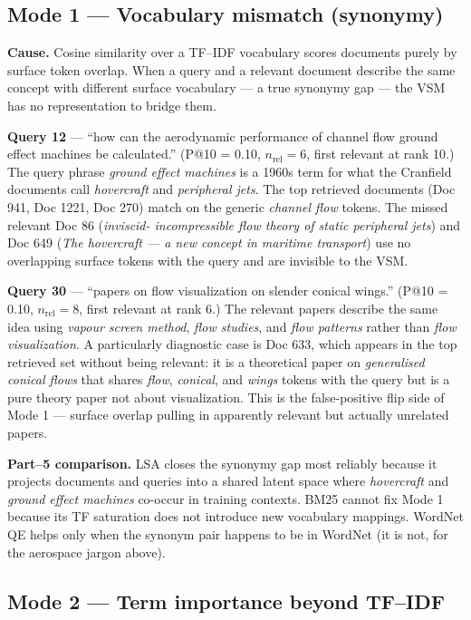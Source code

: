 \documentclass[11pt]{article}
\begin{document}
\subsection{Mode 1 --- Vocabulary mismatch (synonymy)}

\textbf{Cause.} Cosine similarity over a TF--IDF vocabulary scores documents
purely by surface token overlap. When a query and a relevant document
describe the same concept with different surface vocabulary --- a true
synonymy gap --- the VSM has no representation to bridge them.

\textbf{Query 12} --- ``how can the aerodynamic performance of channel flow
ground effect machines be calculated.''
(P@10 = 0.10, $n_{\text{rel}}=6$, first relevant at rank 10.) The query
phrase \emph{ground effect machines} is a 1960s term for what the Cranfield
documents call \emph{hovercraft} and \emph{peripheral jets}. The top
retrieved documents (Doc 941, Doc 1221, Doc 270) match on the generic
\emph{channel flow} tokens. The missed relevant Doc 86 (\emph{inviscid-%
incompressible flow theory of static peripheral jets}) and Doc 649
(\emph{The hovercraft --- a new concept in maritime transport}) use no
overlapping surface tokens with the query and are invisible to the VSM.

\textbf{Query 30} --- ``papers on flow visualization on slender conical
wings.'' (P@10 = 0.10, $n_{\text{rel}}=8$, first relevant at rank 6.) The
relevant papers describe the same idea using \emph{vapour screen method},
\emph{flow studies}, and \emph{flow patterns} rather than \emph{flow
visualization}. A particularly diagnostic case is Doc 633, which appears in
the top retrieved set without being relevant: it is a theoretical paper on
\emph{generalised conical flows} that shares \emph{flow}, \emph{conical},
and \emph{wings} tokens with the query but is a pure theory paper not
about visualization. This is the false-positive flip side of Mode 1 ---
surface overlap pulling in apparently relevant but actually unrelated
papers.

\textbf{Part--5 comparison.} LSA closes the synonymy gap most reliably
because it projects documents and queries into a shared latent space where
\emph{hovercraft} and \emph{ground effect machines} co-occur in training
contexts. BM25 cannot fix Mode 1 because its TF saturation does not
introduce new vocabulary mappings. WordNet QE helps only when the
synonym pair happens to be in WordNet (it is not, for the aerospace jargon
above).

\subsection{Mode 2 --- Term importance beyond TF--IDF}
\end{document}
